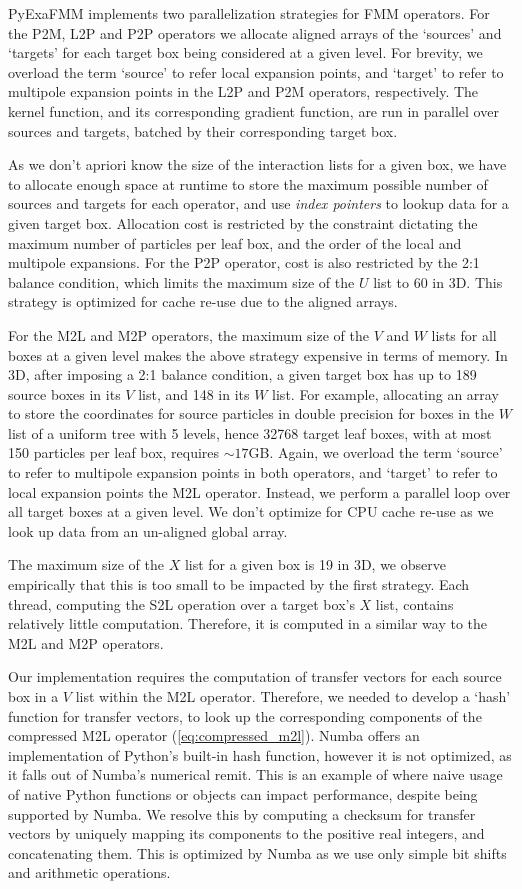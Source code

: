 \documentclass{IEEEcsmag}
\begin{document}
PyExaFMM implements two parallelization strategies for FMM operators. For the P2M, L2P and P2P operators we allocate aligned arrays of the `sources' and `targets' for each target box being considered at a given level. For brevity, we overload the term `source' to refer local expansion points, and `target' to refer to multipole expansion points in the L2P and P2M operators, respectively. The kernel function, and its corresponding gradient function, are run in parallel over sources and targets, batched by their corresponding target box.

As we don't apriori know the size of the interaction lists for a given box, we have to allocate enough space at runtime to store the maximum possible number of sources and targets for each operator, and use \textit{index pointers} to lookup data for a given target box. Allocation cost is restricted by the constraint dictating the maximum number of particles per leaf box, and the order of the local and multipole expansions. For the P2P operator, cost is also restricted by the 2:1 balance condition, which limits the maximum size of the $U$ list to 60 in 3D. This strategy is optimized for cache re-use due to the aligned arrays.

For the M2L and M2P operators, the maximum size of the $V$ and $W$ lists for all boxes at a given level makes the above strategy expensive in terms of memory. In 3D, after imposing a 2:1 balance condition, a given target box has up to 189 source boxes in its $V$ list, and 148 in its $W$ list. For example, allocating an array to store the coordinates for source particles in double precision for boxes in the $W$ list of a uniform tree with 5 levels, hence 32768 target leaf boxes, with at most 150 particles per leaf box, requires $\sim 17$GB. Again, we overload the term `source' to refer to multipole expansion points in both operators, and `target' to refer to local expansion points the M2L operator. Instead, we perform a parallel loop over all target boxes at a given level. We don't optimize for CPU cache re-use as we look up data from an un-aligned global array.

The maximum size of the $X$ list for a given box is 19 in 3D, we observe empirically that this is too small to be impacted by the first strategy. Each thread, computing the S2L operation over a target box's $X$ list, contains relatively little computation. Therefore, it is computed in a similar way to the M2L and M2P operators.

Our implementation requires the computation of transfer vectors for each source box in a $V$ list within the M2L operator. Therefore, we needed to develop a `hash' function for transfer vectors, to look up the corresponding components of the compressed M2L operator (\ref{eq:compressed_m2l}). Numba offers an implementation of Python's built-in hash function, however it is not optimized, as it falls out of Numba's numerical remit. This is an example of where naive usage of native Python functions or objects can impact performance, despite being supported by Numba. We resolve this by computing a checksum for transfer vectors by uniquely mapping its components to the positive real integers, and concatenating them. This is optimized by Numba as we use only simple bit shifts and arithmetic operations.
\end{document}
